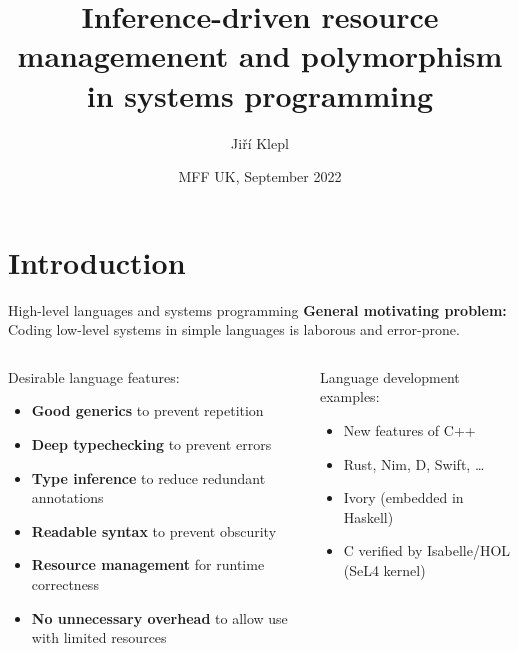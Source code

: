 \documentclass[aspectratio=169]{beamer}
\author{Jiří Klepl}
\title{Inference-driven resource managemenent and polymorphism in systems programming}
\date{MFF UK, September 2022}
\begin{document}
\maketitle

\section{Introduction}

\begin{frame}{High-level languages and systems programming}
\textbf{General motivating problem:}\\
Coding low-level systems in simple languages is laborous and error-prone.

\vspace{5ex}
\begin{columns}
\begin{column}{.5\linewidth}
Desirable language features:
\begin{itemize}\scriptsize
\item \textbf{Good generics} to prevent repetition
\item \textbf{Deep typechecking} to prevent errors
\item \textbf{Type inference} to reduce redundant annotations
\item \textbf{Readable syntax} to prevent obscurity
\item \textbf{Resource management} for runtime correctness
\item \textbf{No unnecessary overhead} to allow use with limited resources
\end{itemize}
\end{column}\pause
\begin{column}{.5\linewidth}
Language development examples:
  \begin{itemize}\scriptsize
  \item New features of C++
  \item Rust, Nim, D, Swift, \dots
  \item Ivory (embedded in Haskell)
  \item C verified by Isabelle/HOL (SeL4 kernel)
  \end{itemize}
\end{column}
\end{columns}
\end{frame}
\end{document}

